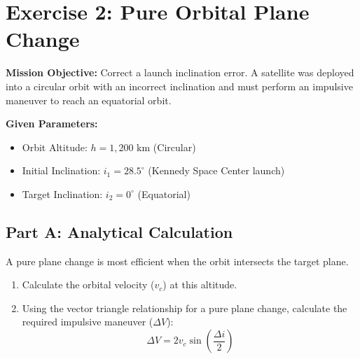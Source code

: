 \documentclass[11pt, letterpaper]{article}
\begin{document}
\section*{Exercise 2: Pure Orbital Plane Change}
\textbf{Mission Objective:} Correct a launch inclination error. A satellite was deployed into a circular orbit with an incorrect inclination and must perform an impulsive maneuver to reach an equatorial orbit.

\textbf{Given Parameters:}
\begin{itemize}
    \item Orbit Altitude: $h = 1,200 \text{ km}$ (Circular)
    \item Initial Inclination: $i_1 = 28.5^\circ$ (Kennedy Space Center launch)
    \item Target Inclination: $i_2 = 0^\circ$ (Equatorial)
\end{itemize}

\subsection*{Part A: Analytical Calculation}
A pure plane change is most efficient when the orbit intersects the target plane. 
\begin{enumerate}
    \item Calculate the orbital velocity ($v_c$) at this altitude.
    \item Using the vector triangle relationship for a pure plane change, calculate the required impulsive maneuver ($\Delta V$):
    \begin{equation}
        \Delta V = 2 v_c \sin \left( \frac{\Delta i}{2} \right)
    \end{equation}
\end{enumerate}
\end{document}
